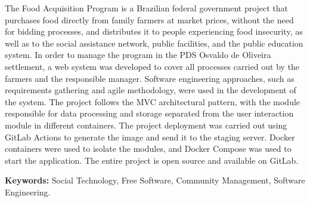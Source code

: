 \begin{foreignabstract}

The Food Acquisition Program is a Brazilian federal government project that purchases food directly from family farmers at market prices, without the need for bidding processes, and distributes it to people experiencing food insecurity, as well as to the social assistance network, public facilities, and the public education system.
In order to manage the program in the PDS Osvaldo de Oliveira settlement, a web system was developed to cover all processes carried out by the farmers and the responsible manager. Software engineering approaches, such as requirements gathering and agile methodology, were used in the development of the system.
The project follows the MVC architectural pattern, with the module responsible for data processing and storage separated from the user interaction module in different containers. The project deployment was carried out using GitLab Actions to generate the image and send it to the staging server.
Docker containers were used to isolate the modules, and Docker Compose was used to start the application. The entire project is open source and available on GitLab.

\vspace{\baselineskip}
\noindent\textbf{Keywords:} Social Technology, Free Software, Community Management, Software Engineering.

\end{foreignabstract}

